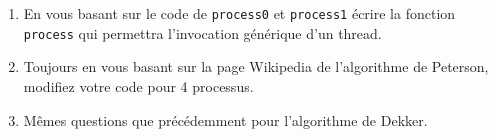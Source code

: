 \documentclass[11pt]{article}
\begin{document}
\begin{enumerate}
 \item En vous basant sur le code de \texttt{process0} et \texttt{process1} écrire la fonction \texttt{process} qui permettra l'invocation générique d'un thread.

 \item Toujours en vous basant sur la page Wikipedia de l'algorithme de Peterson, modifiez votre code pour 4 processus.

 \item Mêmes questions que précédemment pour l'algorithme de Dekker.

\end{enumerate}
\end{document}

